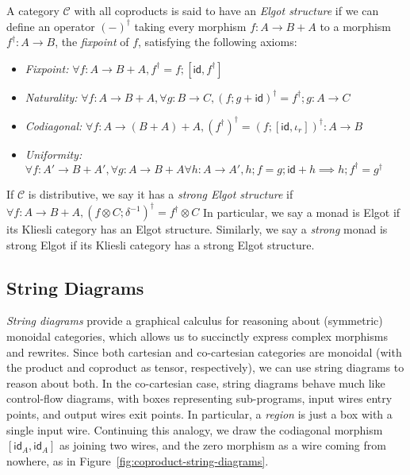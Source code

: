 \documentclass[acmsmall,screen,review]{acmart}
\newcommand{\mc}[1]{\ensuremath{\mathcal{#1}}}
\newcommand{\ms}[1]{\ensuremath{\mathsf{#1}}}
\begin{document}
\begin{definition}
  A category $\mc{C}$ with all coproducts is said to have an \emph{Elgot structure} if we can define
  an operator $(-)^\dagger$ taking every morphism $f : A \to B + A$ to a morphism $f^\dagger : A \to
  B$, the \emph{fixpoint} of $f$, satisfying the following axioms:
  \begin{itemize}
    \item \emph{Fixpoint:} $\forall f : A \to B + A, f^\dagger = f;[\ms{id}, f^\dagger]$
    \item \emph{Naturality:} $\forall f : A \to B + A, \forall g : B \to C, 
      (f;g + \ms{id})^\dagger = f^\dagger;g : A \to C$
    \item \emph{Codiagonal:} $\forall f : A \to (B + A) + A, 
      (f^\dagger)^\dagger = (f;[\ms{id}, \iota_r])^\dagger : A \to B$
    \item \emph{Uniformity:} 
    $
      \forall f : A' \to B + A', \forall g : A \to B + A \forall h : A \to A', 
        h;f = g;\ms{id} + h \implies h;f^\dagger = g^\dagger
    $
  \end{itemize}
  If $\mc{C}$ is distributive, we say it has a \emph{strong Elgot structure} if
  $
  \forall f: A \to B + A, (f \otimes C ; \delta^{-1})^\dagger = f^\dagger \otimes C
  $
  In particular, we say a monad is Elgot if its Kliesli category has an Elgot structure. Similarly,
  we say a \emph{strong} monad is strong Elgot if its Kliesli category has a strong Elgot structure.
\end{definition}

\subsection{String Diagrams}

\emph{String diagrams} provide a graphical calculus for reasoning about (symmetric) monoidal
categories, which allows us to succinctly express complex morphisms and rewrites. Since both
cartesian and co-cartesian categories are monoidal (with the product and coproduct as tensor,
respectively), we can use string diagrams to reason about both. In the co-cartesian case, string
diagrams behave much like control-flow diagrams, with boxes representing sub-programs, input wires
entry points, and output wires exit points. In particular, a \emph{region} is just a box with a
single input wire. Continuing this analogy, we draw the codiagonal morphism $[\ms{id}_A, \ms{id}_A]$
as joining two wires, and the zero morphism as a wire coming from nowhere, as in
Figure~\ref{fig:coproduct-string-diagrams}. 
\end{document}
